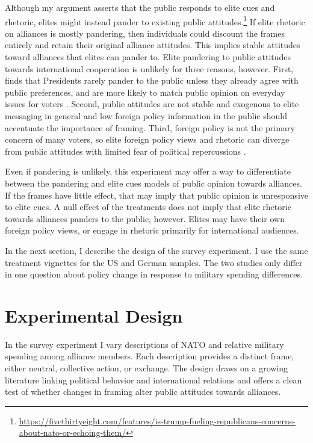\documentclass[12pt]{article}
\begin{document}
Although my argument asserts that the public responds to elite cues and rhetoric, elites might instead pander to existing public attitudes.\footnote{\url{https://fivethirtyeight.com/features/is-trump-fueling-republicans-concerns-about-nato-or-echoing-them/}}
If elite rhetoric on alliances is mostly pandering, then individuals could discount the frames entirely and retain their original alliance attitudes.
This implies stable attitudes toward alliances that elites can pander to.  
Elite pandering to public attitudes towards international cooperation is unlikely for three reasons, however. 
First, \citet{Canes-Wrone2006} finds that Presidents rarely pander to the public unless they already agree with public preferences, and are more likely to match public opinion on everyday issues for voters \citep{Canes-WroneSchotts2004}.  
Second, public attitudes are not stable and exogenous to elite messaging in general \citep{Druckman2014} and low foreign policy information in the public should accentuate the importance of framing.
Third, foreign policy is not the primary concern of many voters, so elite foreign policy views and rhetoric can diverge from public attitudes with limited fear of political repercussions \citep{BusbyMonten2012}. 


Even if pandering is unlikely, this experiment may offer a way to differentiate between the pandering and elite cues models of public opinion towards alliances. 
If the frames have little effect, that may imply that public opinion is unresponsive to elite cues. 
A null effect of the treatments does not imply that elite rhetoric towards alliances panders to the public, however. 
Elites may have their own foreign policy views, or engage in rhetoric primarily for international audiences. 


In the next section, I describe the design of the survey experiment. 
I use the same treatment vignettes for the US and German samples. 
The two studies only differ in one question about policy change in response to military spending differences. 


\section{Experimental Design}


In the survey experiment I vary descriptions of NATO and relative military spending among alliance members. 
Each description provides a distinct frame, either neutral, collective action, or exchange. 
The design draws on a growing literature linking political behavior and international relations \citep{Hafner-Burtonetal2017} and offers a clean test of whether changes in framing alter public attitudes towards alliances.
\end{document}
